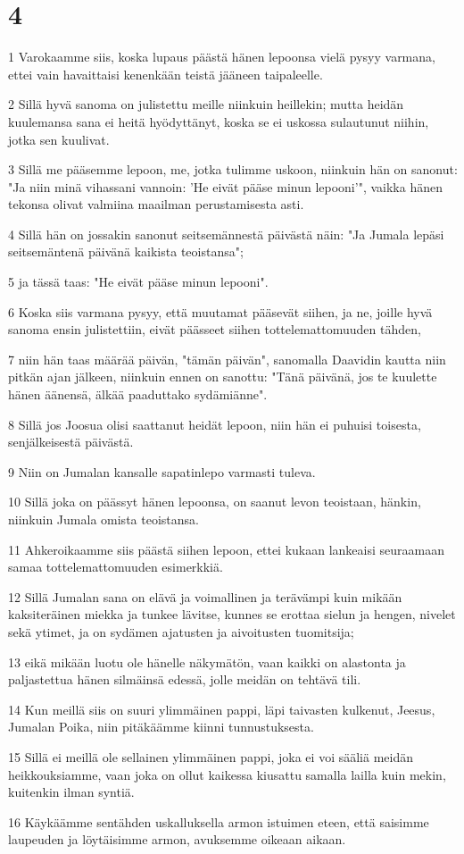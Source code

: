 \chapter{4}

\par 1 Varokaamme siis, koska lupaus päästä hänen lepoonsa vielä pysyy varmana, ettei vain havaittaisi kenenkään teistä jääneen taipaleelle.
\par 2 Sillä hyvä sanoma on julistettu meille niinkuin heillekin; mutta heidän kuulemansa sana ei heitä hyödyttänyt, koska se ei uskossa sulautunut niihin, jotka sen kuulivat.
\par 3 Sillä me pääsemme lepoon, me, jotka tulimme uskoon, niinkuin hän on sanonut: "Ja niin minä vihassani vannoin: 'He eivät pääse minun lepooni'", vaikka hänen tekonsa olivat valmiina maailman perustamisesta asti.
\par 4 Sillä hän on jossakin sanonut seitsemännestä päivästä näin: "Ja Jumala lepäsi seitsemäntenä päivänä kaikista teoistansa";
\par 5 ja tässä taas: "He eivät pääse minun lepooni".
\par 6 Koska siis varmana pysyy, että muutamat pääsevät siihen, ja ne, joille hyvä sanoma ensin julistettiin, eivät päässeet siihen tottelemattomuuden tähden,
\par 7 niin hän taas määrää päivän, "tämän päivän", sanomalla Daavidin kautta niin pitkän ajan jälkeen, niinkuin ennen on sanottu: "Tänä päivänä, jos te kuulette hänen äänensä, älkää paaduttako sydämiänne".
\par 8 Sillä jos Joosua olisi saattanut heidät lepoon, niin hän ei puhuisi toisesta, senjälkeisestä päivästä.
\par 9 Niin on Jumalan kansalle sapatinlepo varmasti tuleva.
\par 10 Sillä joka on päässyt hänen lepoonsa, on saanut levon teoistaan, hänkin, niinkuin Jumala omista teoistansa.
\par 11 Ahkeroikaamme siis päästä siihen lepoon, ettei kukaan lankeaisi seuraamaan samaa tottelemattomuuden esimerkkiä.
\par 12 Sillä Jumalan sana on elävä ja voimallinen ja terävämpi kuin mikään kaksiteräinen miekka ja tunkee lävitse, kunnes se erottaa sielun ja hengen, nivelet sekä ytimet, ja on sydämen ajatusten ja aivoitusten tuomitsija;
\par 13 eikä mikään luotu ole hänelle näkymätön, vaan kaikki on alastonta ja paljastettua hänen silmäinsä edessä, jolle meidän on tehtävä tili.
\par 14 Kun meillä siis on suuri ylimmäinen pappi, läpi taivasten kulkenut, Jeesus, Jumalan Poika, niin pitäkäämme kiinni tunnustuksesta.
\par 15 Sillä ei meillä ole sellainen ylimmäinen pappi, joka ei voi sääliä meidän heikkouksiamme, vaan joka on ollut kaikessa kiusattu samalla lailla kuin mekin, kuitenkin ilman syntiä.
\par 16 Käykäämme sentähden uskalluksella armon istuimen eteen, että saisimme laupeuden ja löytäisimme armon, avuksemme oikeaan aikaan.

